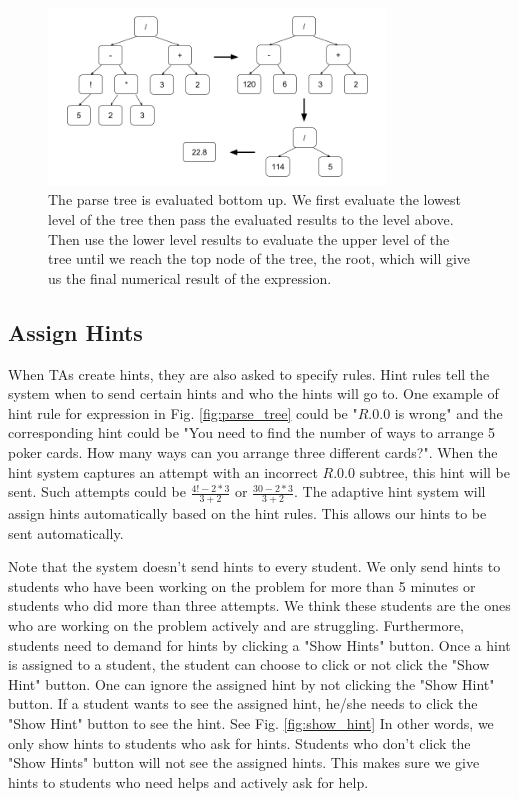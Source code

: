 \documentclass{article} %
\begin{document}
\begin{figure}[ht]
   \centering
   \includegraphics[width=0.8\textwidth]{image/Eval_Trees.png}
   \caption{The parse tree is evaluated bottom up. We first evaluate the lowest level of the tree then pass the evaluated results to the level above. Then use the lower level results to evaluate the upper level of the tree until we reach the top node of the tree, the root, which will give us the final numerical result of the expression.}
   \label{fig:eval_tree}
\end{figure}


\subsection*{Assign Hints}
When TAs create hints, they are also asked to specify rules. Hint rules tell the system when to send certain hints and who the hints will go to. One example of hint rule for expression in Fig. \ref{fig:parse_tree} could be "$R.0.0$ is wrong" and the corresponding hint could be "You need to find the number of ways to arrange 5 poker cards. How many ways can you arrange three different cards?". When the hint system captures an attempt with an incorrect $R.0.0$ subtree, this hint will be sent. Such attempts could be $\frac{4!-2*3}{3+2}$ or $\frac{30-2*3}{3+2}$. The adaptive hint system will assign hints automatically based on the hint rules. This allows our hints to be sent automatically.

Note that the system doesn't send hints to every student. We only send hints to students who have been working on the problem for more than 5 minutes or students who did more than three attempts. We think these students are the ones who are working on the problem actively and are struggling. Furthermore, students need to demand for hints by clicking a "Show Hints" button. Once a hint is assigned to a student, the student can choose to click or not click the "Show Hint" button. One can ignore the assigned hint by not clicking the "Show Hint" button. If a student wants to see the assigned hint, he/she needs to click the "Show Hint" button to see the hint. See Fig. \ref{fig:show_hint} In other words, we only show hints to students who ask for hints. Students who don't click the "Show Hints" button will not see the assigned hints. This makes sure we give hints to students who need helps and actively ask for help. 
\end{document}
